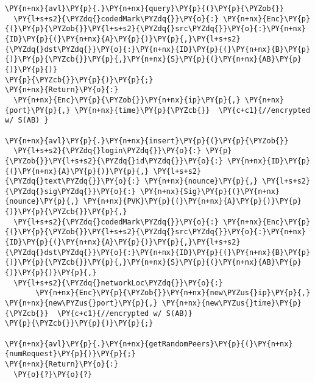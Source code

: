 \begin{Verbatim}[commandchars=\\\{\},codes={\catcode`\$=3\catcode`\^=7\catcode`\_=8}]
\PY{n+nx}{avl}\PY{p}{.}\PY{n+nx}{query}\PY{p}{(}\PY{p}{\PYZob{}}
  \PY{l+s+s2}{\PYZdq{}codedMark\PYZdq{}}\PY{o}{:} \PY{n+nx}{Enc}\PY{p}{(}\PY{p}{\PYZob{}}\PY{l+s+s2}{\PYZdq{}src\PYZdq{}}\PY{o}{:}\PY{n+nx}{ID}\PY{p}{(}\PY{n+nx}{A}\PY{p}{)}\PY{p}{,}\PY{l+s+s2}{\PYZdq{}dst\PYZdq{}}\PY{o}{:}\PY{n+nx}{ID}\PY{p}{(}\PY{n+nx}{B}\PY{p}{)}\PY{p}{\PYZcb{}}\PY{p}{,}\PY{n+nx}{S}\PY{p}{(}\PY{n+nx}{AB}\PY{p}{)}\PY{p}{)}
\PY{p}{\PYZcb{}}\PY{p}{)}\PY{p}{;}
\PY{n+nx}{Return}\PY{o}{:}
  \PY{n+nx}{Enc}\PY{p}{\PYZob{}}\PY{n+nx}{ip}\PY{p}{,} \PY{n+nx}{port}\PY{p}{,} \PY{n+nx}{time}\PY{p}{\PYZcb{}}  \PY{c+c1}{//encrypted w/ S(AB) }

\PY{n+nx}{avl}\PY{p}{.}\PY{n+nx}{insert}\PY{p}{(}\PY{p}{\PYZob{}}
  \PY{l+s+s2}{\PYZdq{}login\PYZdq{}}\PY{o}{:} \PY{p}{\PYZob{}}\PY{l+s+s2}{\PYZdq{}id\PYZdq{}}\PY{o}{:} \PY{n+nx}{ID}\PY{p}{(}\PY{n+nx}{A}\PY{p}{)}\PY{p}{,} \PY{l+s+s2}{\PYZdq{}text\PYZdq{}}\PY{o}{:} \PY{n+nx}{nounce}\PY{p}{,} \PY{l+s+s2}{\PYZdq{}sig\PYZdq{}}\PY{o}{:} \PY{n+nx}{Sig}\PY{p}{(}\PY{n+nx}{nounce}\PY{p}{,} \PY{n+nx}{PVK}\PY{p}{(}\PY{n+nx}{A}\PY{p}{)}\PY{p}{)}\PY{p}{\PYZcb{}}\PY{p}{,}
  \PY{l+s+s2}{\PYZdq{}codedMark\PYZdq{}}\PY{o}{:} \PY{n+nx}{Enc}\PY{p}{(}\PY{p}{\PYZob{}}\PY{l+s+s2}{\PYZdq{}src\PYZdq{}}\PY{o}{:}\PY{n+nx}{ID}\PY{p}{(}\PY{n+nx}{A}\PY{p}{)}\PY{p}{,}\PY{l+s+s2}{\PYZdq{}dst\PYZdq{}}\PY{o}{:}\PY{n+nx}{ID}\PY{p}{(}\PY{n+nx}{B}\PY{p}{)}\PY{p}{\PYZcb{}}\PY{p}{,}\PY{n+nx}{S}\PY{p}{(}\PY{n+nx}{AB}\PY{p}{)}\PY{p}{)}\PY{p}{,}
  \PY{l+s+s2}{\PYZdq{}networkLoc\PYZdq{}}\PY{o}{:} 
       \PY{n+nx}{Enc}\PY{p}{\PYZob{}}\PY{n+nx}{new\PYZus{}ip}\PY{p}{,} \PY{n+nx}{new\PYZus{}port}\PY{p}{,} \PY{n+nx}{new\PYZus{}time}\PY{p}{\PYZcb{}}  \PY{c+c1}{//encrypted w/ S(AB)}
\PY{p}{\PYZcb{}}\PY{p}{)}\PY{p}{;}

\PY{n+nx}{avl}\PY{p}{.}\PY{n+nx}{getRandomPeers}\PY{p}{(}\PY{n+nx}{numRequest}\PY{p}{)}\PY{p}{;}
\PY{n+nx}{Return}\PY{o}{:}
  \PY{o}{?}\PY{o}{?}
\end{Verbatim}
